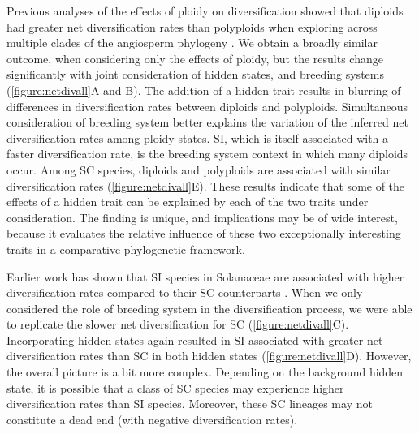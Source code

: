 Previous analyses of the effects of ploidy on diversification showed that diploids had greater net diversification rates than polyploids when exploring across multiple clades of the angiosperm phylogeny \citet{mayrose_2011, mayrose_2015}. 
We obtain a broadly similar outcome, when considering only the effects of ploidy, but the results change significantly with joint consideration of hidden states, and breeding systems (\cref{figure:netdivall}A and B). 
The addition of a hidden trait results in blurring of differences in diversification rates between diploids and polyploids.
Simultaneous consideration of breeding system better explains the variation of the inferred net diversification rates among ploidy states. %
SI, which is itself associated with a faster diversification rate, is the breeding system context in which many diploids occur.
Among SC species, diploids and polyploids are associated with similar diversification rates (\cref{figure:netdivall}E).
These results indicate that some of the effects of a hidden trait can be explained by each of the two traits under consideration. %
The finding is unique, and implications may be of wide interest, because it evaluates the relative influence of these two exceptionally interesting traits in a comparative phylogenetic framework.

Earlier work has shown that SI species in Solanaceae are associated with higher diversification rates compared to their SC counterparts \citep{goldberg_2010}. 
When we only considered the role of breeding system in the diversification process, we were able to replicate the slower net diversification for SC  (\cref{figure:netdivall}C).  %
Incorporating hidden states again resulted in SI associated with greater net diversification rates than SC in both hidden states  (\cref{figure:netdivall}D). 
However, the overall picture is a bit more complex.
Depending on the background hidden state, it is possible that a class of SC species may experience higher diversification rates than SI species.
Moreover, these SC lineages may not constitute a dead end (with negative diversification rates).



